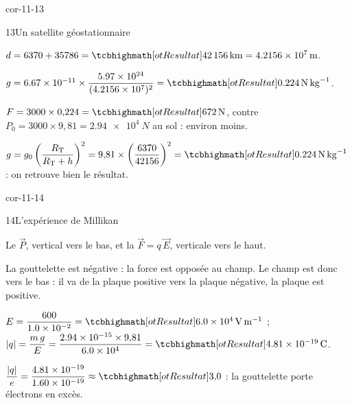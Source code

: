 \begin{blocLivre}{cor-11-13}
\begin{corrige}{13}{Un satellite géostationnaire}
\begin{questions}
\item $d=6370+35786=\res{\qty{42156}{km}}=\qty{4,2156e7}{m}$.
\item $g=\num{6,67e-11}\times\dfrac{\num{5,97e24}}{(\num{4,2156e7})^2}=\res{\qty{0,224}{N.kg^{-1}}}$.
\item $F=3000\times0{,}224=\res{\qty{672}{N}}$, contre $P_0=3000\times9{,}81=\qty{2,94e4}{N}$ au sol : environ  moins.
\item $g=g_0\left(\dfrac{R_\mathrm{T}}{R_\mathrm{T}+h}\right)^2=9{,}81\times\left(\dfrac{6370}{42156}\right)^2=\res{\qty{0,224}{N.kg^{-1}}}$ : on retrouve bien le résultat.
\end{questions}
\end{corrige}
\end{blocLivre}
\begin{blocLivre}{cor-11-14}
\begin{corrige}{14}{L'expérience de Millikan}
\begin{questions}
\item Le  $\vec{P}$, vertical vers le bas, et la  $\vec{F}=q\,\vec{E}$, verticale vers le haut.
\item La gouttelette est négative : la force est opposée au champ. Le champ est donc vers le bas : il va de la plaque positive
vers la plaque négative, la plaque  est positive.
\item $E=\dfrac{600}{\num{1,0e-2}}=\res{\qty{6,0e4}{V.m^{-1}}}$ ; $|q|=\dfrac{m\,g}{E}=\dfrac{\num{2,94e-15}\times9{,}81}{\num{6,0e4}}=\res{\qty{4,81e-19}{C}}$.
\item $\dfrac{|q|}{e}=\dfrac{\num{4,81e-19}}{\num{1,60e-19}}\approx\res{3{,}0}$ : la gouttelette porte  électrons en excès.
\end{questions}
\end{corrige}
\end{blocLivre}
